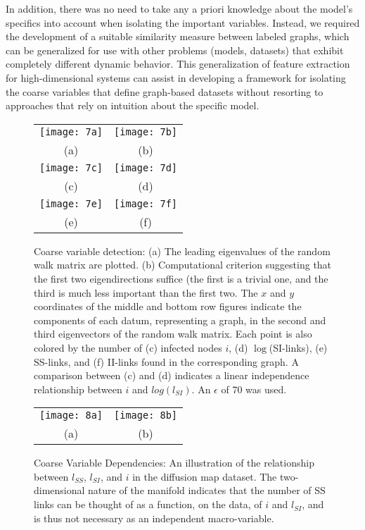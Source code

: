 In addition, there was no need to take any a priori knowledge about
the model's specifics into account when isolating the important
variables. Instead, we required the development of a suitable
similarity measure between labeled graphs, which can be generalized
for use with other problems (models, datasets) that exhibit completely
different dynamic behavior. This generalization of feature extraction
for high-dimensional systems can assist in developing a framework for
isolating the coarse variables that define graph-based datasets
without resorting to approaches that rely on intuition about the
specific model.


\begin{figure}[!htp]
\centering
\begin{tabular}{cc}
  \texttt{[image: 7a]} &
  \texttt{[image: 7b]}\\
  (a) & (b)\\
  \texttt{[image: 7c]} &
  \texttt{[image: 7d]}\\
  (c) & (d)\\
  \texttt{[image: 7e]} &
  \texttt{[image: 7f]}\\
  (e) & (f)
\end{tabular}
\caption[DMAPS results on SIS networks]{Coarse variable detection: (a) The leading eigenvalues of the
  random walk matrix are plotted. (b) Computational criterion
  suggesting that the first two eigendirections suffice (the first is
  a trivial one, and the third is much less important than the first
  two. The $x$ and $y$ coordinates of the middle and bottom row
  figures indicate the components of each datum, representing a graph,
  in the second and third eigenvectors of the random walk matrix. Each
  point is also colored by the number of (c) infected nodes $i$, (d)
  $\log$(SI-links), (e) SS-links, and (f) II-links found in the
  corresponding graph. A comparison between (c) and (d) indicates a
  linear independence relationship between $i$ and $log(l_{SI})$. An
  $\epsilon$ of 70 was used. \label{fig:sis7}}
\end{figure}

\begin{figure}[!htp]
\centering
\begin{tabular}{cc}
  \texttt{[image: 8a]} &
  \texttt{[image: 8b]}\\
  (a) & (b)
\end{tabular}
\caption[Another view of DMAPS results on SIS networks]{Coarse Variable Dependencies: An illustration of the
  relationship between $l_{SS}$, $l_{SI}$, and $i$ in the diffusion
  map dataset. The two-dimensional nature of the manifold indicates
  that the number of SS links can be thought of as a function, on the
  data, of $i$ and $l_{SI}$, and is thus not necessary as an
  independent macro-variable. \label{fig:sis8}}
\end{figure}


